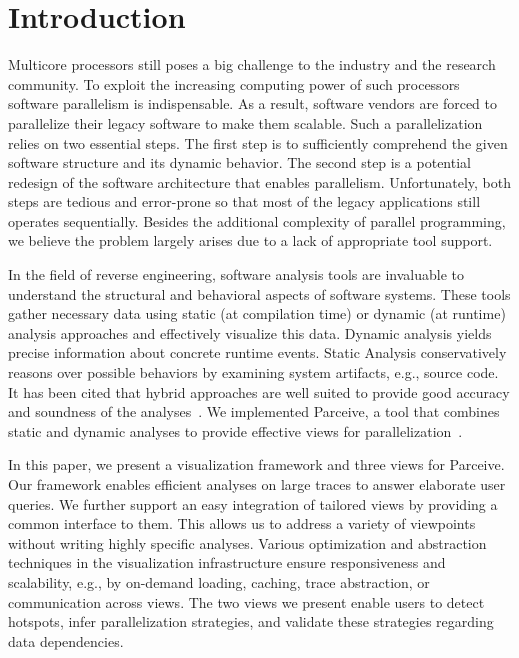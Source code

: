 \section{Introduction}
\label{sec:introduction}
Multicore processors still poses a big challenge to the industry and the
research community. To exploit the increasing computing power of such
processors software parallelism is indispensable. As a result, software vendors
are forced to parallelize their legacy software to make them scalable. Such a
parallelization relies on two essential steps. The first step is to
sufficiently comprehend the given software structure and its dynamic behavior.
The second step is a potential redesign of the software architecture that
enables parallelism. Unfortunately, both steps are tedious and error-prone so
that most of the legacy applications still operates sequentially. Besides the
additional complexity of parallel programming, we believe the problem largely
arises due to a lack of appropriate tool support.

In the field of reverse engineering, software analysis tools are invaluable to
understand the structural and behavioral aspects of software systems. These
tools gather necessary data using static (at compilation time) or dynamic
(at runtime) analysis approaches and effectively visualize this data. Dynamic
analysis yields precise information about concrete runtime events. Static
Analysis conservatively reasons over possible behaviors by examining system
artifacts, e.g., source code. It has been cited that hybrid approaches are well
suited to provide good accuracy and soundness of the
analyses~\cite{StaticDynamic}. We implemented Parceive, a tool that combines
static and dynamic analyses to provide effective views for
parallelization~\cite{Parceive}.

In this paper, we present a visualization framework and three views for
Parceive. Our framework enables efficient analyses on large traces to answer
elaborate user queries. We further support an easy integration of tailored
views by providing a common interface to them. This allows us to address a
variety of viewpoints without writing highly specific analyses. Various
optimization and abstraction techniques in the visualization infrastructure
ensure responsiveness and scalability, e.g., by on-demand loading, caching,
trace abstraction, or communication across views. The two views we present
enable users to detect hotspots, infer parallelization strategies, and validate
these strategies regarding data dependencies.